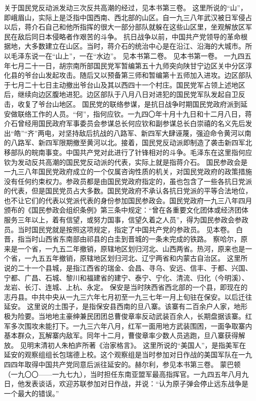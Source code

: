 \begin{maonote}
关于国民党反动派发动三次反共高潮的经过，见本书第三卷。
这里所说的“山”，即峨眉山，实际上是泛指中国西南、西北部的山区。自一九三八年武汉被日军侵占以后，蒋介石自己和他所指挥的很大一部分部队就躲在这些山区里，坐观解放区军民在敌后同日本侵略者作艰苦的斗争。
抗日战争以前，中国共产党领导的革命根据地，大多数建立在山区。当时，蒋介石的统治中心是在沿江、沿海的大城市。所以毛泽东说一在“山上”，一在“水边”。
见本书第二卷。
见本书第一卷。
一九四五年七月二十一日，胡宗南所部国民党军暂编第五十九师突向陕甘宁边区关中分区淳化县的爷台山发起攻击。随后又以预备第三师和暂编第十五师加入进攻。边区部队于七月二十七日主动撤出爷台山及其以西四十一个村庄。国民党军占领上述地区后，继续向边区腹地进犯。边区部队于八月八日对进犯的国民党军队发起自卫反击，收复了爷台山地区。
国民党的联络参谋，是抗日战争时期国民党政府派到延安做联络工作的人员。“何”，指何应钦。一九四〇年十月十九日和十二月八日，蒋介石曾经用国民政府军事委员会参谋总长何应钦和副参谋总长白崇禧的名义先后发出“皓”“齐”两电，对坚持敌后抗战的八路军、新四军大肆诬蔑，强迫命令黄河以南的八路军、新四军限期撤至黄河以北。接着，国民党反动派即制造了袭击新四军北移部队的皖南事变。中国共产党对此进行了针锋相对的斗争。毛泽东在这里指何应钦为发动反共高潮的国民党反动派的代表，实际上就是指蒋介石。
国民参政会是一九三八年国民党政府成立的一个仅属咨询性质的机关，对国民党政府的政策措施没有任何约束权力。参政员都是由国民党政府指定的，虽也包含了一些各抗日党派的代表，但是国民党员占大多数。国民党政府不承认各抗日党派的平等合法地位，也不让它们的代表以党派代表的身份参加国民参政会。国民党政府一九三八年四月颁布的《国民参政会组织条例》第三条中规定：“曾在各重要文化团体或经济团体服务三年以上，着有信望，或努力国事，信望久着之人员”，得为国民参政会参政员。当时国民党就是按照这项规定，指定了中国共产党的参政员。
见本卷。
白晋，指当时山西省东南部由祁县的白圭到晋城的一条未完成的铁路。
察哈尔，原来是一个省，一九五二年撤销，原辖地区划归河北、山西两省。热河，原来也是一个省，一九五五年撤销，原辖地区划归河北、辽宁两省和内蒙古自治区。
这里所说的二十一个县城，是指江西省的瑞金、会昌、寻乌、安远、信丰、于都、兴国、宁都、广昌、石城、黎川和福建省的建宁、泰宁、宁化、清流、归化（今明溪）、龙岩、长汀、连城、上杭、永定。
保安是当时陕西省西北部的一个县，即现在的志丹县。中共中央从一九三六年七月初至一九三七年一月上旬驻在保安。以后迁往延安。
这里说的土围子，是指保安县西南的旦八寨。该寨有二百余户人家，地形极为险要。当地地主豪绅兼民团团总曹俊章率反动武装百余人，长期盘据该寨。红军多次围攻未能打下。一九三六年八月，红军一面用地方武装围困，一面争取寨内基本群众，瓦解寨内敌军。同年十二月，曹俊章率少数人员逃跑，旦八寨获得解放。
见明末清初人朱柏庐所著《治家格言》。
这里所说的“美国人”，是指美军在延安的观察组组长包瑞德上校。这个观察组是当时参加对日作战的美国军队在一九四四年取得中国共产党同意后派往延安的。赫尔利，参见本书第三卷。
蒙巴顿（一九〇〇——一九七九），当时担任东南亚盟军最高指挥官。一九四五年八月九日，他发表谈话，欢迎苏联参加对日作战，并说：“认为原子弹会停止远东战争是一个最大的错误。”
\end{maonote}

